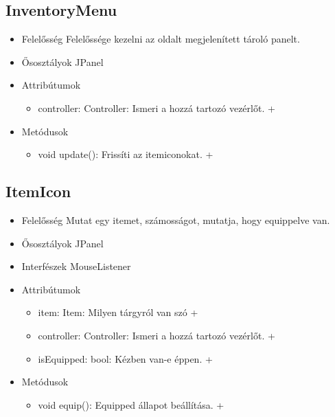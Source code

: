 \subsection{InventoryMenu }
\begin{itemize}
	\item Felelősség\newline
	Felelőssége kezelni az oldalt megjelenített tároló panelt.
	\item Ősosztályok\newline
	JPanel
	\item Attribútumok\newline
	\begin{itemize}
		\item controller: Controller: Ismeri a hozzá tartozó vezérlőt. +	
	\end{itemize}
	\item Metódusok\newline
	\begin{itemize}
		\item void update(): Frissíti az itemiconokat. +
	\end{itemize}
\end{itemize}

\subsection{ItemIcon}
\begin{itemize}
	\item Felelősség\newline
	Mutat egy itemet, számosságot, mutatja, hogy equippelve van.
	\item Ősosztályok\newline
	JPanel
	\item Interfészek\newline
	MouseListener
	\item Attribútumok\newline
	\begin{itemize}
		\item item: Item: Milyen tárgyról van szó +
		\item controller: Controller: Ismeri a hozzá tartozó vezérlőt. +	
		\item isEquipped: bool: Kézben van-e éppen. +
	\end{itemize}
	\item Metódusok\newline
	\begin{itemize}
		\item void equip(): Equipped állapot beállítása. +
	\end{itemize}
\end{itemize}

